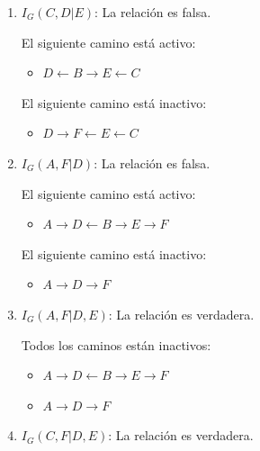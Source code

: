 \documentclass[12pt,a4paper]{article}
\begin{document}
\begin{enumerate}
\begin{enumerate}
        \item $I_G(C, D | E)$: \; La relación es falsa.
        
        \begin{multicols}{2}
            El siguiente camino está activo:
            \begin{itemize}
                \item $D \leftarrow B \to E \leftarrow C$
            \end{itemize}

            El siguiente camino está inactivo:
            \begin{itemize}
                \item $D \to F \leftarrow E \leftarrow C$
            \end{itemize}
        \end{multicols}

        \item $I_G(A, F | D)$: \; La relación es falsa.
        
        \begin{multicols}{2}
            El siguiente camino está activo:
            \begin{itemize}
                \item $A \to D \leftarrow B \to E \to F$
            \end{itemize}

            El siguiente camino está inactivo:
            \begin{itemize}
                \item $A \to D \to F$
            \end{itemize}
        \end{multicols}    

        \item $I_G(A, F | D, E)$: \; La relación es verdadera.
        
        Todos los caminos están inactivos:
        \begin{multicols}{2}
            \begin{itemize}
                \item $A \to D \leftarrow B \to E \to F$
                \item $A \to D \to F$
            \end{itemize}
        \end{multicols}

        \item $I_G(C, F | D, E)$: \; La relación es verdadera.
        

\end{enumerate}
\end{enumerate}
\end{document}
